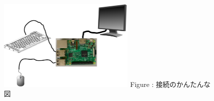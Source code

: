 \documentclass[a4paper,12pt]{jarticle}
\begin{document}
\begin{figure}[ht]
  \centering
  \begin{minipage}{12.204cm}
    {\upshape
      \includegraphics[width=0.6\textwidth]{connections01.png}
      \newline
      Figure : 接続のかんたんな図}

  \end{minipage}
\end{figure}
\end{document}
